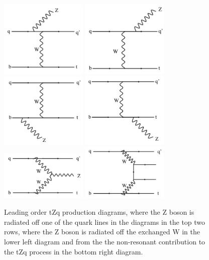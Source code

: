 \begin{figure}[h]
\centering
\includegraphics[width=0.37\textwidth]{figs/top-physics/tZq_feyn1.jpg}
\includegraphics[width=0.37\textwidth]{figs/top-physics/tZq_feyn2.jpg}
\includegraphics[width=0.37\textwidth]{figs/top-physics/tZq_feyn3.jpg}
\includegraphics[width=0.37\textwidth]{figs/top-physics/tZq_feyn4.jpg}
\includegraphics[width=0.37\textwidth]{figs/top-physics/tZq_feyn5.jpg}
\includegraphics[width=0.37\textwidth]{figs/top-physics/tZq_feyn6.jpg}
\caption{Leading order tZq production diagrams, where the Z boson is radiated off one of the quark lines in the diagrams in the top two rows, where the Z boson is radiated off the exchanged W in the lower left diagram and from the the non-resonant contribution to the tZq process in the bottom right diagram.}
\label{fig:feyn_tZq}
\end{figure}

